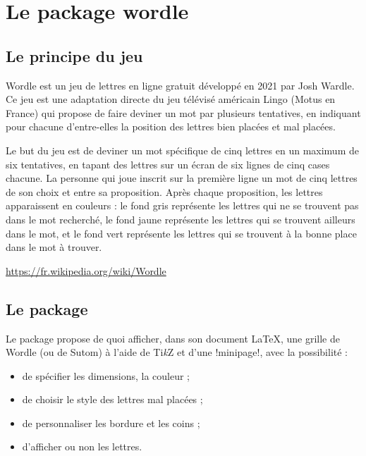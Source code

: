 \documentclass[french,a4paper,11pt]{article}
\providecommand\tikzlogo{Ti\textit{k}Z}
\let\TikZ\tikzlogo
\begin{document}
{\newpage

\section{Le package wordle}

\subsection{Le principe du jeu}

\begin{noteblock}
Wordle est un jeu de lettres en ligne gratuit développé en 2021 par Josh Wardle. Ce jeu est une adaptation directe du jeu télévisé américain Lingo (Motus en France) qui propose de faire deviner un mot par plusieurs tentatives, en indiquant pour chacune d'entre-elles la position des lettres bien placées et mal placées.

Le but du jeu est de deviner un mot spécifique de cinq lettres en un maximum de six tentatives, en tapant des lettres sur un écran de six lignes de cinq cases chacune. La personne qui joue inscrit sur la première ligne un mot de cinq lettres de son choix et entre sa proposition. Après chaque proposition, les lettres apparaissent en couleurs : le fond gris représente les lettres qui ne se trouvent pas dans le mot recherché, le fond jaune représente les lettres qui se trouvent ailleurs dans le mot, et le fond vert représente les lettres qui se trouvent à la bonne place dans le mot à trouver.

\smallskip

\hfill{\scriptsize \url{https://fr.wikipedia.org/wiki/Wordle}}
\end{noteblock}

\subsection{Le package}

\begin{noteblock}
Le package propose de quoi afficher, dans son document \LaTeX, une grille de Wordle (ou de Sutom) à l'aide de \TikZ{} et d'une \motcletex!minipage!, avec la possibilité :

\begin{itemize}
	\item de spécifier les dimensions, la couleur ;
	\item de choisir le style des lettres mal placées ;
	\item de personnaliser les bordure et les coins ;
	\item d'afficher ou non les lettres.
\end{itemize}


\end{noteblock}}
\end{document}
